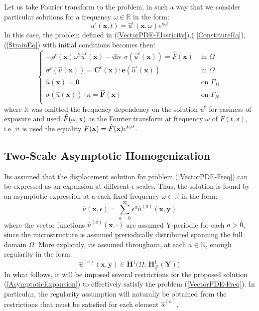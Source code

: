 Let us take Fourier transform to the problem, in such a way that we consider particular solutions for a frequency $\omega \in \mathbb{R}$ in the form:
\begin{equation}
    \label{FreqAnsatz}
    u^{\epsilon}(\mathbf{x},t) = \hat{u}^{\epsilon}(\mathbf{x},\omega) e^{i \omega t}
\end{equation}
In this case, the problem defined in (\ref{VectorPDE-Elasticity}),( \ref{ConstituteEq}), (\ref{StrainEq}) with initial conditions becomes then:
\begin{equation}
    \label{VectorPDE-Freq}
    \left \{
    \begin{array}{cc}
        -\rho^{\epsilon} (\mathbf{x}) \omega^2 \hat{u}^{\epsilon}(\mathbf{x}) - \text{div }\sigma (\hat{u}^{\epsilon}(\mathbf{x})) = \hat{F}(\mathbf{x})  & \text{ in }  \Omega \\
        \sigma^{\epsilon} (\hat{u}(\mathbf{x})) = \mathbf{C}^{\epsilon}(\mathbf{x}): \mathbf{e} (\hat{u}^{\epsilon}(\mathbf{x})) & \text{ in } \Omega  \\
        \hat{u}(\mathbf{x}) = \mathbf{0} & \text{ on } \Gamma_D\\
        \sigma (\hat{u}(\mathbf{x}))\cdot n = \hat{\mathbf{F}}(\mathbf{x}) & \text{ on } \Gamma_N \\
    \end{array}
    \right .
\end{equation}
where it was omitted the frequency dependency on the solution $\hat{u}^{\epsilon}$ for easiness of exposure and used $\Hat{F}(\omega, \mathbf{x})$ as the Fourier transform at frequency $\omega$ of $F(t, \mathbb{x})$, i.e. it is used the equality $F(\mathbf{x}) = \Hat{F}(\mathbf{x})e^{i \omega t}$.

\subsection{Two-Scale Asymptotic Homogenization}
Its assumed that the displacement solution for problem (\ref{VectorPDE-Freq}) can be expressed as an expansion at different $\epsilon$ scales. Thus, the solution is found by an asymptotic expression at a each fixed frequency $\omega \in \mathbb{R}$ in the form:
\begin{equation*}
    \label{AsymptoticExpansion}
    \hat{u}(\mathbf{x},\epsilon) = \sum_{a=0}^{\infty} \epsilon^a \hat{u}^{(a)}(\mathbf{x},\mathbf{y}) 
\end{equation*}
where the vector functions $\hat{u}^{(a)}(\mathbf{x}, \cdot)$ are assumed Y-periodic for each $a>0$, since the microstructure is assumed preriodically distributed spanning the full domain $\Omega$. More explicitly, its assumed throughout, at each $a \in \mathbb{N}$, enough regularity in the form:
\begin{equation*}
    \hat{u}^{(a)}(\mathbf{x},\mathbf{y}) \in \mathbf{H}^1\big(\Omega; \, \mathbf{H}^1_{\#}(\mathbf{Y})\big)
\end{equation*}
In what follows, it will be imposed several restrictions for the proposed solution (\ref{AsymptoticExpansion}) to effectively satisfy the problem (\ref{VectorPDE-Freq}). In particular, the regularity assumption will naturally be obtained from the restrictions that must be satisfied for each element $\hat{u}^{(a)}$.

